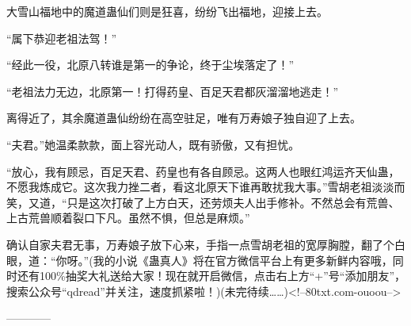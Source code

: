 \begin{this_body}
大雪山福地中的魔道蛊仙们则是狂喜，纷纷飞出福地，迎接上去。

“属下恭迎老祖法驾！”

“经此一役，北原八转谁是第一的争论，终于尘埃落定了！”

“老祖法力无边，北原第一！打得药皇、百足天君都灰溜溜地逃走！”

离得近了，其余魔道蛊仙纷纷在高空驻足，唯有万寿娘子独自迎了上去。

“夫君。”她温柔款款，面上容光动人，既有骄傲，又有担忧。

“放心，我有顾忌，百足天君、药皇也有各自顾忌。这两人也眼红鸿运齐天仙蛊，不愿我炼成它。这次我力挫二者，看这北原天下谁再敢扰我大事。”雪胡老祖淡淡而笑，又道，“只是这次打破了上方白天，还劳烦夫人出手修补。不然总会有荒兽、上古荒兽顺着裂口下凡。虽然不惧，但总是麻烦。”

确认自家夫君无事，万寿娘子放下心来，手指一点雪胡老祖的宽厚胸膛，翻了个白眼，道：“你呀。”(我的小说《蛊真人》将在官方微信平台上有更多新鲜内容哦，同时还有100\%抽奖大礼送给大家！现在就开启微信，点击右上方“+”号“添加朋友”，搜索公众号“qdread”并关注，速度抓紧啦！)(未完待续……)<!--80txt.com-ouoou-->

------------

\end{this_body}

